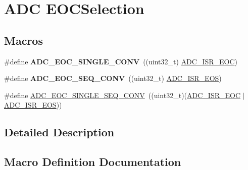 \hypertarget{group___a_d_c___e_o_c_selection}{}\section{A\+DC E\+O\+C\+Selection}
\label{group___a_d_c___e_o_c_selection}
\subsection*{Macros}
\begin{DoxyCompactItemize}
\item 
\mbox{\label{group___a_d_c___e_o_c_selection_ga4c455483d74c1be899d4b2e8f45f202b}} 
\#define {\bfseries A\+D\+C\+\_\+\+E\+O\+C\+\_\+\+S\+I\+N\+G\+L\+E\+\_\+\+C\+O\+NV}~((uint32\+\_\+t) \hyperlink{group___peripheral___registers___bits___definition_ga949681e78b978c1ccd680f11137a1550}{A\+D\+C\+\_\+\+I\+S\+R\+\_\+\+E\+OC})
\item 
\mbox{\label{group___a_d_c___e_o_c_selection_ga6c71ff64c9ecc9ba19ac088009f36cd8}} 
\#define {\bfseries A\+D\+C\+\_\+\+E\+O\+C\+\_\+\+S\+E\+Q\+\_\+\+C\+O\+NV}~((uint32\+\_\+t) \hyperlink{group___peripheral___registers___bits___definition_ga56b6edb70e1c04c5e03a935d2c945f50}{A\+D\+C\+\_\+\+I\+S\+R\+\_\+\+E\+OS})
\item 
\#define \hyperlink{group___a_d_c___e_o_c_selection_ga0cbb4e6ee76ee1bef233212bf947d320}{A\+D\+C\+\_\+\+E\+O\+C\+\_\+\+S\+I\+N\+G\+L\+E\+\_\+\+S\+E\+Q\+\_\+\+C\+O\+NV}~((uint32\+\_\+t)(\hyperlink{group___peripheral___registers___bits___definition_ga949681e78b978c1ccd680f11137a1550}{A\+D\+C\+\_\+\+I\+S\+R\+\_\+\+E\+OC} $\vert$ \hyperlink{group___peripheral___registers___bits___definition_ga56b6edb70e1c04c5e03a935d2c945f50}{A\+D\+C\+\_\+\+I\+S\+R\+\_\+\+E\+OS}))
\end{DoxyCompactItemize}


\subsection{Detailed Description}


\subsection{Macro Definition Documentation}
\mbox{\label{group___a_d_c___e_o_c_selection_ga0cbb4e6ee76ee1bef233212bf947d320}} 
